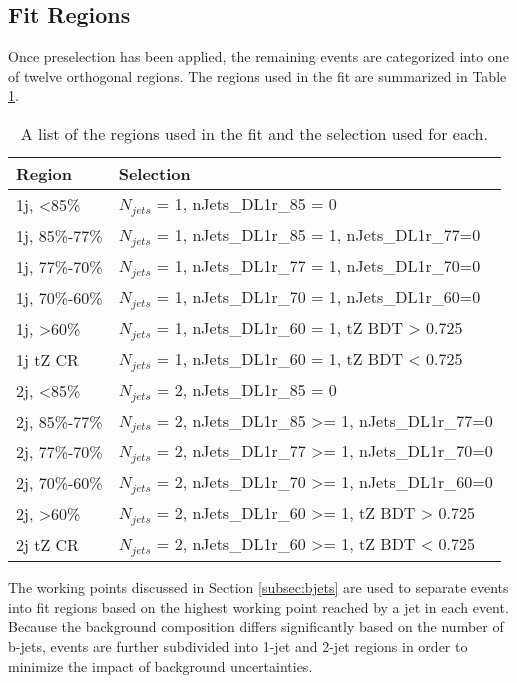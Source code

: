 \subsection{Fit Regions}
\label{subsec:regions}

Once preselection has been applied, the remaining events are categorized into one of twelve orthogonal regions. The regions used in the fit are summarized in Table \ref{tab:regions}.

\begin{table}[H] 
\centering
\caption{A list of the regions used in the fit and the selection used for each.}
\begin{tabular}{l|l}
\hline\hline
Region & Selection            \\
\hline
\hline
1j, <85\%       & $N_{jets}$ = 1, nJets\_DL1r\_85 = 0            \\
1j, 85\%-77\%   & $N_{jets}$ = 1, nJets\_DL1r\_85 = 1, nJets\_DL1r\_77=0                     \\
1j, 77\%-70\%   & $N_{jets}$ = 1, nJets\_DL1r\_77 = 1, nJets\_DL1r\_70=0                     \\
1j, 70\%-60\%   & $N_{jets}$ = 1, nJets\_DL1r\_70 = 1, nJets\_DL1r\_60=0                      \\
1j, >60\%       & $N_{jets}$ = 1, nJets\_DL1r\_60 = 1, tZ BDT > 0.725 \\
1j tZ CR        & $N_{jets}$ = 1, nJets\_DL1r\_60 = 1, tZ BDT < 0.725 \\
2j, <85\%       & $N_{jets}$ = 2, nJets\_DL1r\_85 = 0                    \\
2j, 85\%-77\%   & $N_{jets}$ = 2, nJets\_DL1r\_85 >= 1, nJets\_DL1r\_77=0                     \\
2j, 77\%-70\%   & $N_{jets}$ = 2, nJets\_DL1r\_77 >= 1, nJets\_DL1r\_70=0                     \\
2j, 70\%-60\%   & $N_{jets}$ = 2, nJets\_DL1r\_70 >= 1, nJets\_DL1r\_60=0                      \\
2j, >60\%       & $N_{jets}$ = 2, nJets\_DL1r\_60 >= 1, tZ BDT > 0.725 \\
2j tZ CR        & $N_{jets}$ = 2, nJets\_DL1r\_60 >= 1, tZ BDT < 0.725 \\
\hline\hline
\end{tabular}
\label{tab:regions}
\end{table}

The working points discussed in Section \ref{subsec:bjets} are used to separate events into fit regions based on the highest working point reached by a jet in each event. Because the background composition differs significantly based on the number of b-jets, events are further subdivided into 1-jet and 2-jet regions in order to minimize the impact of background uncertainties.

